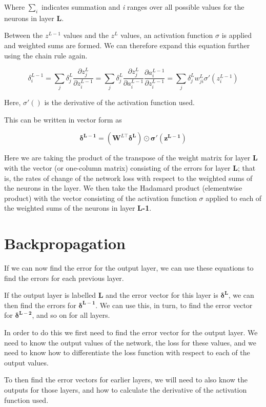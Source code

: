 \documentclass[12pt]{article}
\begin{document}
Where $\sum_{i}$ indicates summation and \textit{i} ranges over all possible values for the neurons in layer \textbf{L}.

Between the $z^{L-1}$ values and the $z^{L}$ values, an activation function $\sigma$ is applied and weighted sums are formed. We can therefore expand this equation further using the chain rule again.

\begin{equation} \label{eq:6}
\delta^{L-1}_i=
\sum_{j} \delta^{L}_{j}\frac{\partial z^{L}_j}{\partial z^{L-1}_i}
=
\sum_{j} \delta^{L}_{j}\frac{\partial z^{L}_j}{\partial a^{L-1}_i}
\frac{\partial a^{L-1}_i}{\partial z^{L-1}_i}
=\sum_{j} \delta^{L}_{j}w^{L}_{ji}\sigma'(z^{L-1}_{i})
\end{equation}

Here, $\sigma'()$ is the derivative of the activation function used.

This can be written in vector form as

\begin{equation} \label{eq:7}
\boxed{
        \mathbf{\delta^{L-1}} = (\mathbf{W}^{L\top}\mathbf{\delta^{L}})\odot\mathbf{\sigma'(z^{L-1})}
}
\end{equation}

Here we are taking the product of the transpose of the weight matrix for layer \textbf{L} with the vector (or one-column matrix) consisting of the errors for layer \textbf{L}; that is, the rates of change of the network loss with respect to the weighted sums of the neurons in the layer. We then take the Hadamard product (elementwise product) with the vector consisting of the activation function $\sigma$ applied to each of the weighted sums of the neurons in layer \textbf{L-1}.

\section{Backpropagation}

If we can now find the error for the output layer, we can use these equations to find the errors for each previous layer.

If the output layer is labelled \textbf{L} and the error vector for this layer is $\mathbf{\delta^{L}}$, we can then find the errors for $\mathbf{\delta^{L-1}}$. We can use this, in turn, to find the error vector for $\mathbf{\delta^{L-2}}$, and so on for all layers.

In order to do this we first need to find the error vector for the output layer. We need to know the output values of the network, the loss for these values, and we need to know how to differentiate the loss function with respect to each of the output values.

To then find the error vectors for earlier layers, we will need to also know the outputs for those layers, and how to calculate the derivative of the activation function used.




\end{document}
